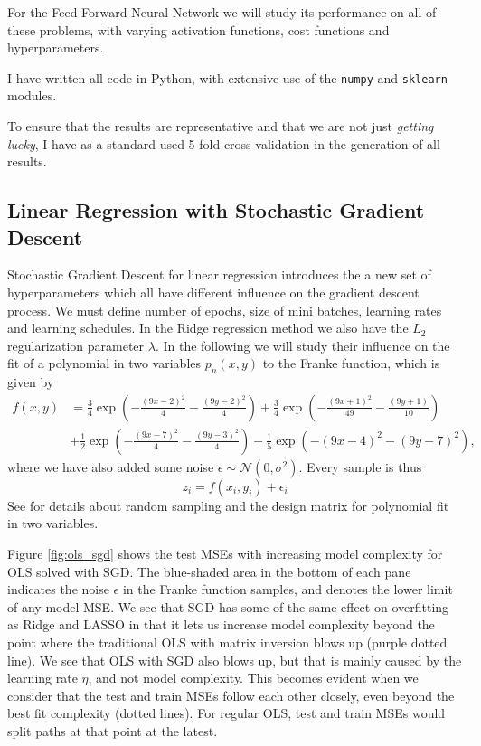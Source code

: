 \documentclass[]{article}
\begin{document}
For the Feed-Forward Neural Network we will study its performance on all of these problems, with varying activation functions, cost functions and hyperparameters.

I have written all code in Python, with extensive use of the \lstinline|numpy| and \lstinline|sklearn| modules.

To ensure that the results are representative and that we are not just \textit{getting lucky}, I have as a standard used 5-fold cross-validation in the generation of all results.

\subsection{Linear Regression with Stochastic Gradient Descent}

Stochastic Gradient Descent for linear regression introduces the a new set of hyperparameters which all have different influence on the gradient descent process. We must define number of epochs, size of mini batches, learning rates and learning schedules. In the Ridge regression method we also have the $L_2$ regularization parameter $\lambda$. In the following we will study their influence on the fit of a polynomial in two variables $p_n(x,y)$ to the Franke function, which is given by
\begin{equation}
\label{franke}
	\begin{aligned}
		f(x,y) &= \frac{3}{4}\exp{\left(-\frac{(9x-2)^2}{4} - \frac{(9y-2)^2}{4}\right)}+\frac{3}{4}\exp{\left(-\frac{(9x+1)^2}{49}- \frac{(9y+1)}{10}\right)} \\
		&+\frac{1}{2}\exp{\left(-\frac{(9x-7)^2}{4} - \frac{(9y-3)^2}{4}\right)} -\frac{1}{5}\exp{\left(-(9x-4)^2 - (9y-7)^2\right) },
	\end{aligned}
\end{equation}
where we have also added some noise $\epsilon \sim \mathcal{N}(0, \sigma^2)$. Every sample is thus
\begin{equation}
	z_i = f(x_i, y_i) + \epsilon_i
\end{equation}
See \cite{project1} for details about random sampling and the design matrix for polynomial fit in two variables.

Figure \ref{fig:ols_sgd} shows the test MSEs with increasing model complexity for OLS solved with SGD. The blue-shaded area in the bottom of each pane indicates the noise $\epsilon$ in the Franke function samples, and denotes the lower limit of any model MSE. We see that SGD has some of the same effect on overfitting as Ridge and LASSO in that it lets us increase model complexity beyond the point where the traditional OLS with matrix inversion blows up (purple dotted line). We see that OLS with SGD also blows up, but that is mainly caused by the learning rate $\eta$, and not model complexity. This becomes evident when we consider that the test and train MSEs follow each other closely, even beyond the best fit complexity (dotted lines). For regular OLS, test and train MSEs would split paths at that point at the latest.
\end{document}
